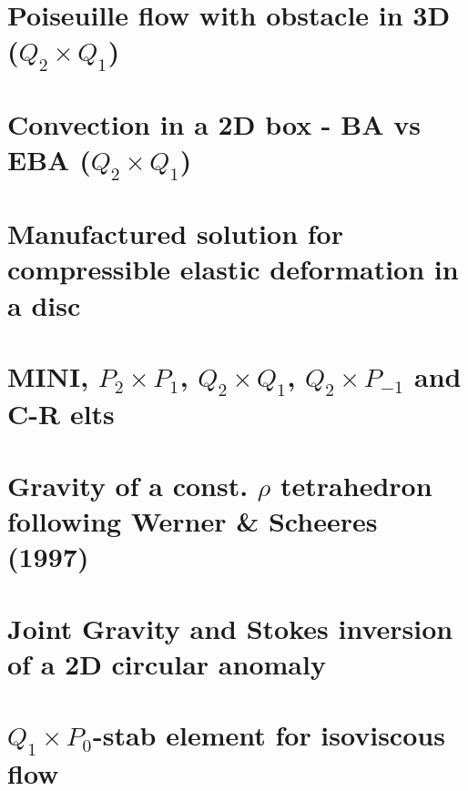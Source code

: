 \documentclass[a4paper,11pt]{report}
\begin{document}
\chapter{Poiseuille flow with obstacle in 3D ($Q_2\times Q_1$) \label{f109}}

\chapter{Convection in a 2D box - BA vs EBA ($Q_2\times Q_1$) \label{f110}}

\chapter{Manufactured solution for compressible elastic deformation in a disc\label{f111}}

\chapter{MINI, $P_2\times P_1$,  $Q_2\times Q_1$, $Q_2\times P_{-1}$ and C-R elts\label{f112}}

\chapter{Gravity of a const. $\rho$ tetrahedron following Werner \& Scheeres (1997) \label{f113}}

\chapter{Joint Gravity and Stokes inversion of a 2D circular anomaly \label{f114}}

\chapter{$Q_1\times P_0$-stab element for isoviscous flow \label{f115}}
\end{document}
